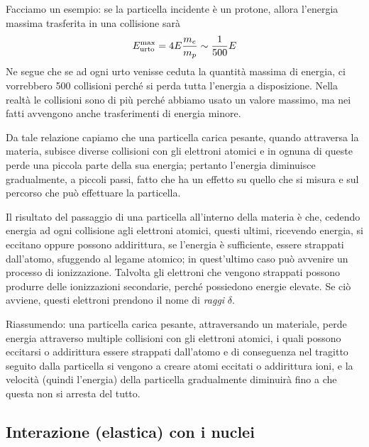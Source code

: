 Facciamo un esempio: se la particella incidente è un protone, allora l'energia massima trasferita in una collisione sarà
\begin{equation*}
    E_{\rm urto}^{\rm max}
    =4E\frac{m_e}{m_p}
    \sim \frac{1}{500} E
\end{equation*}
Ne segue che se ad ogni urto venisse ceduta la quantità massima di energia, ci vorrebbero 500 collisioni perché si perda tutta l'energia a disposizione. Nella realtà le collisioni sono di più perché abbiamo usato un valore massimo, ma nei fatti avvengono anche trasferimenti di energia minore.

Da tale relazione capiamo che una particella carica pesante, quando attraversa la materia, subisce diverse collisioni con gli elettroni atomici e in ognuna di queste perde una piccola parte della sua energia; pertanto l'energia diminuisce gradualmente, a piccoli passi, fatto che ha un effetto su quello che si misura e sul percorso che può effettuare la particella.

Il risultato del passaggio di una particella all'interno della materia è che, cedendo energia ad ogni collisione agli elettroni atomici, questi ultimi, ricevendo energia, si eccitano oppure possono addirittura, se l'energia è sufficiente, essere strappati dall'atomo, sfuggendo al legame atomico; in quest'ultimo caso può avvenire un processo di ionizzazione. Talvolta gli elettroni che vengono strappati possono produrre delle ionizzazioni secondarie, perché possiedono energie elevate. Se ciò avviene, questi elettroni prendono il nome di \textit{raggi} $\delta$.

Riassumendo: una particella carica pesante, attraversando un materiale, perde energia attraverso multiple collisioni con gli elettroni atomici, i quali possono eccitarsi o addirittura essere strappati dall'atomo e di conseguenza nel tragitto seguito dalla particella si vengono a creare atomi eccitati o addirittura ioni, e la velocità (quindi l'energia) della particella gradualmente diminuirà fino a che questa non si arresta del tutto.

\subsection{Interazione (elastica) con i nuclei}

